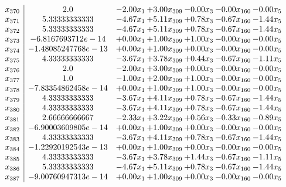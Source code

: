 \documentclass[8pt]{article}
\begin{document}
\[\begin{array}{c| c c@{\hskip 2pt} c@{\hskip 2pt} c@{\hskip 2pt} c@{\hskip 2pt} c@{\hskip 2pt} }
 x_{370}   &  2.0 & -2.00 x_{1} & +  3.00 x_{309} & -0.00 x_{3} & -0.00 x_{160} & -0.00 x_{5}\\
 x_{371}   &  5.33333333333 & -4.67 x_{1} & +  5.11 x_{309} & +  0.78 x_{3} & -0.67 x_{160} & -1.44 x_{5}\\
 x_{372}   &  5.33333333333 & -4.67 x_{1} & +  5.11 x_{309} & +  0.78 x_{3} & -0.67 x_{160} & -1.44 x_{5}\\
 x_{373}   &  -6.8167693712e-14 & +  0.00 x_{1} & +  1.00 x_{309} & +  1.00 x_{3} & -0.00 x_{160} & -0.00 x_{5}\\
 x_{374}   &  -1.48085247768e-13 & +  0.00 x_{1} & +  1.00 x_{309} & +  0.00 x_{3} & -0.00 x_{160} & -0.00 x_{5}\\
 x_{375}   &  4.33333333333 & -3.67 x_{1} & +  3.78 x_{309} & +  0.44 x_{3} & -0.67 x_{160} & -1.11 x_{5}\\
 x_{376}   &  2.0 & -2.00 x_{1} & +  3.00 x_{309} & +  0.00 x_{3} & -0.00 x_{160} & -0.00 x_{5}\\
 x_{377}   &  1.0 & -1.00 x_{1} & +  2.00 x_{309} & +  1.00 x_{3} & -0.00 x_{160} & -0.00 x_{5}\\
 x_{378}   &  -7.83354862458e-14 & +  0.00 x_{1} & +  1.00 x_{309} & +  1.00 x_{3} & -0.00 x_{160} & -0.00 x_{5}\\
 x_{379}   &  4.33333333333 & -3.67 x_{1} & +  4.11 x_{309} & +  0.78 x_{3} & -0.67 x_{160} & -1.44 x_{5}\\
 x_{380}   &  4.33333333333 & -3.67 x_{1} & +  4.11 x_{309} & +  0.78 x_{3} & -0.67 x_{160} & -1.44 x_{5}\\
 x_{381}   &  2.66666666667 & -2.33 x_{1} & +  3.22 x_{309} & +  0.56 x_{3} & -0.33 x_{160} & -0.89 x_{5}\\
 x_{382}   &  -6.90003609805e-14 & +  0.00 x_{1} & +  1.00 x_{309} & +  0.00 x_{3} & -0.00 x_{160} & -0.00 x_{5}\\
 x_{383}   &  4.33333333333 & -3.67 x_{1} & +  4.11 x_{309} & +  0.78 x_{3} & -0.67 x_{160} & -1.44 x_{5}\\
 x_{384}   &  -1.22920192543e-13 & +  0.00 x_{1} & +  1.00 x_{309} & +  0.00 x_{3} & -0.00 x_{160} & -0.00 x_{5}\\
 x_{385}   &  4.33333333333 & -3.67 x_{1} & +  3.78 x_{309} & +  1.44 x_{3} & -0.67 x_{160} & -1.11 x_{5}\\
 x_{386}   &  5.33333333333 & -4.67 x_{1} & +  5.11 x_{309} & +  0.78 x_{3} & -0.67 x_{160} & -1.44 x_{5}\\
 x_{387}   &  -9.00760947313e-14 & +  0.00 x_{1} & +  1.00 x_{309} & +  0.00 x_{3} & -0.00 x_{160} & -0.00 x_{5}\\

\end{array}\]
\end{document}

